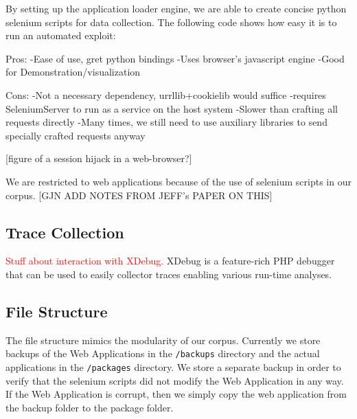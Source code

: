 \documentclass[letterpaper,twocolumn,10pt]{article}
\begin{document}
By setting up the application loader engine, we are able to create concise python selenium scripts for data collection.  The following code shows how easy it is to run an automated exploit:

Pros:
-Ease of use, gret python bindings
-Uses browser's javascript engine
-Good for Demonstration/visualization

Cons:
-Not a necessary dependency, urrllib+cookielib would suffice
-requires SeleniumServer to run as a service on the host system
-Slower than crafting all requests directly
-Many times, we still need to use auxiliary libraries to send specially crafted requests anyway

[figure of a session hijack in a web-browser?]

We are restricted to web applications because of the use of selenium scripts in our corpus. [GJN ADD NOTES FROM JEFF's PAPER ON THIS]  


%
%
%

%


\subsection{Trace Collection}
\textcolor{red}{
Stuff about interaction with XDebug.
}
XDebug is a feature-rich PHP debugger that can be used to easily collector traces enabling various run-time analyses.\par

\subsection{File Structure}

The file structure mimics the modularity of our corpus.  Currently we store backups of the Web Applications in the {\tt/backups} directory and the actual applications in the {\tt/packages} directory.  We store a separate backup in order to verify that the selenium scripts did not modify the Web Application in any way.  If the Web Application is corrupt, then we simply copy the web application from the backup folder to the package folder.  
\end{document}
